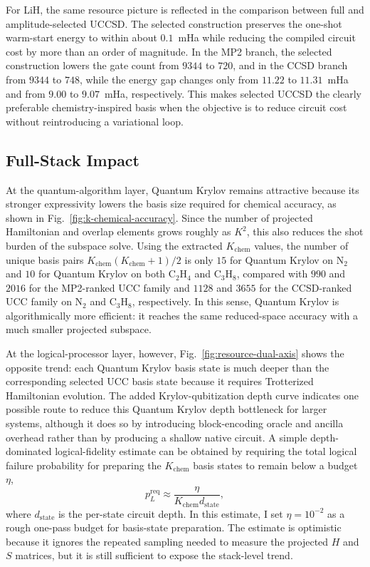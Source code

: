 For LiH, the same resource picture is reflected in the comparison between full
and amplitude-selected UCCSD. The selected construction preserves the one-shot
warm-start energy to within about $0.1$~mHa while reducing the compiled circuit
cost by more than an order of magnitude. In the MP2 branch, the selected
construction lowers the gate count from $9344$ to $720$, and in the CCSD branch
from $9344$ to $748$, while the energy gap changes only from $11.22$ to
$11.31$~mHa and from $9.00$ to $9.07$~mHa, respectively. This makes selected
UCCSD the clearly preferable chemistry-inspired basis when the objective is to
reduce circuit cost without reintroducing a variational loop.

\subsection{Full-Stack Impact}

At the quantum-algorithm layer, Quantum Krylov remains attractive
because its stronger expressivity lowers the basis size required for chemical
accuracy, as shown in Fig.~\ref{fig:k-chemical-accuracy}. Since the number of
projected Hamiltonian and overlap elements grows roughly as $K^2$, this also
reduces the shot burden of the subspace solve. Using the extracted
$K_{\mathrm{chem}}$ values, the number of unique basis pairs
$K_{\mathrm{chem}}(K_{\mathrm{chem}}+1)/2$ is only $15$ for Quantum Krylov on N$_2$ and
$10$ for Quantum Krylov on both C$_2$H$_4$ and C$_3$H$_8$, compared with $990$ and
$2016$ for the MP2-ranked UCC family and $1128$ and $3655$ for the
CCSD-ranked UCC family on N$_2$ and C$_3$H$_8$, respectively. In this sense,
Quantum Krylov is algorithmically more efficient: it reaches the same reduced-space
accuracy with a much smaller projected subspace.

At the logical-processor layer, however, Fig.~\ref{fig:resource-dual-axis}
shows the opposite trend: each Quantum Krylov basis state is much deeper than the
corresponding selected UCC basis state because it requires Trotterized
Hamiltonian evolution. The added Krylov-qubitization depth curve indicates one possible
route to reduce this Quantum Krylov depth bottleneck for larger systems, although it
does so by introducing block-encoding oracle and ancilla overhead rather than
by producing a shallow native circuit. A simple depth-dominated logical-fidelity estimate can
be obtained by requiring the total logical failure probability for preparing the
$K_{\mathrm{chem}}$ basis states to remain below a budget $\eta$,
\begin{equation}
    p_L^{\mathrm{req}} \approx \frac{\eta}{K_{\mathrm{chem}} d_{\mathrm{state}}},
\end{equation}
where $d_{\mathrm{state}}$ is the per-state circuit depth. In
this estimate, I set $\eta=10^{-2}$ as a rough one-pass budget for basis-state
preparation. The estimate is optimistic because it ignores the repeated
sampling needed to measure the projected $H$ and $S$ matrices, but it is still
sufficient to expose the stack-level trend.

